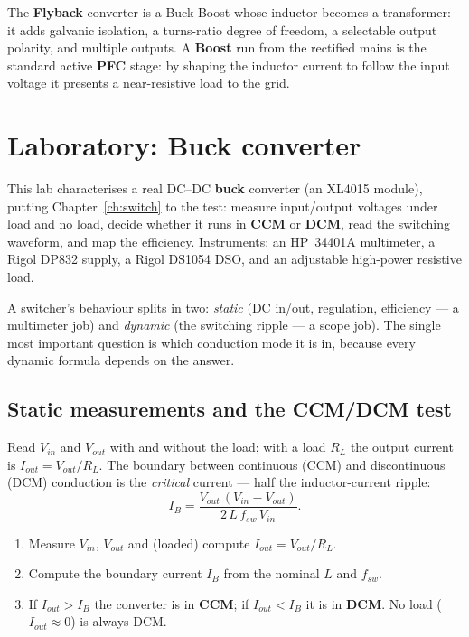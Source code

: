\documentclass[11pt,a4paper,oneside]{book}
\begin{document}
\begin{note}
The \textbf{Flyback} converter is a Buck-Boost whose inductor becomes a
transformer: it adds galvanic isolation, a turns-ratio degree of freedom, a
selectable output polarity, and multiple outputs. A \textbf{Boost} run from the
rectified mains is the standard active \textbf{PFC} stage: by shaping the
inductor current to follow the input voltage it presents a near-resistive load to
the grid.
\end{note}

\chapter{Laboratory: Buck converter}\label{ch:lab-buck}

This lab characterises a real DC--DC \textbf{buck} converter (an XL4015 module),
putting Chapter~\ref{ch:switch} to the test: measure input/output voltages under
load and no load, decide whether it runs in \textbf{CCM} or \textbf{DCM}, read the
switching waveform, and map the efficiency. Instruments: an HP~34401A multimeter,
a Rigol DP832 supply, a Rigol DS1054 DSO, and an adjustable high-power resistive
load.

\begin{keyidea}
A switcher's behaviour splits in two: \emph{static} (DC in/out, regulation,
efficiency --- a multimeter job) and \emph{dynamic} (the switching ripple ---
a scope job). The single most important question is which conduction mode it is
in, because every dynamic formula depends on the answer.
\end{keyidea}

\section{Static measurements and the CCM/DCM test}

Read $V_{in}$ and $V_{out}$ with and without the load; with a load $R_L$ the output
current is $I_{out}=V_{out}/R_L$. The boundary between continuous (CCM) and
discontinuous (DCM) conduction is the \emph{critical} current --- half the
inductor-current ripple:
\[
I_{B}=\frac{V_{out}\,(V_{in}-V_{out})}{2\,L\,f_{sw}\,V_{in}}.
\]

\begin{protocol}
\begin{enumerate}[leftmargin=1.5cm]
  \item Measure $V_{in}$, $V_{out}$ and (loaded) compute $I_{out}=V_{out}/R_L$.
  \item Compute the boundary current $I_{B}$ from the nominal $L$ and $f_{sw}$.
  \item If $I_{out}>I_{B}$ the converter is in \textbf{CCM}; if $I_{out}<I_{B}$
        it is in \textbf{DCM}. No load ($I_{out}\!\approx\!0$) is always DCM.
\end{enumerate}
\end{protocol}
\end{document}

